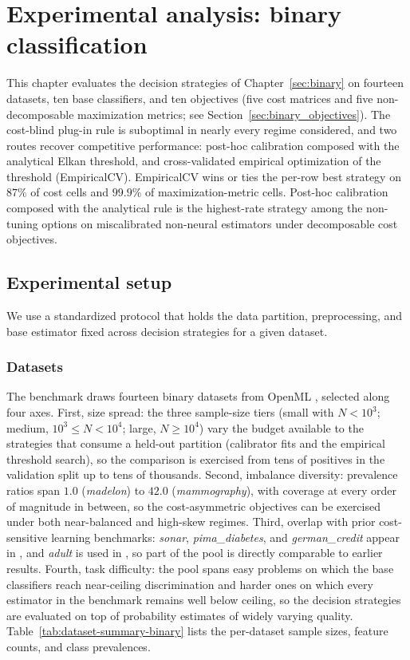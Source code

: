 \chapter{Experimental analysis: binary classification}\label{sec:binary_experiments}

This chapter evaluates the decision strategies of Chapter~\ref{sec:binary} on fourteen datasets, ten base classifiers, and ten objectives (five cost matrices and five non-decomposable maximization metrics; see Section~\ref{sec:binary_objectives}). The cost-blind plug-in rule is suboptimal in nearly every regime considered, and two routes recover competitive performance: post-hoc calibration composed with the analytical Elkan threshold, and cross-validated empirical optimization of the threshold (EmpiricalCV). EmpiricalCV wins or ties the per-row best strategy on $87\%$ of cost cells and $99.9\%$ of maximization-metric cells. Post-hoc calibration composed with the analytical rule is the highest-rate strategy among the non-tuning options on miscalibrated non-neural estimators under decomposable cost objectives.

\section{Experimental setup}

We use a standardized protocol that holds the data partition, preprocessing, and base estimator fixed across decision strategies for a given dataset.

\subsection{Datasets}
The benchmark draws fourteen binary datasets from OpenML \citep{vanschoren2014openml}, selected along four axes. First, size spread: the three sample-size tiers (small with $N < 10^3$; medium, $10^3 \leq N < 10^4$; large, $N \geq 10^4$) vary the budget available to the strategies that consume a held-out partition (calibrator fits and the empirical threshold search), so the comparison is exercised from tens of positives in the validation split up to tens of thousands. Second, imbalance diversity: prevalence ratios span $1.0$ (\textit{madelon}) to $42.0$ (\textit{mammography}), with coverage at every order of magnitude in between, so the cost-asymmetric objectives can be exercised under both near-balanced and high-skew regimes. Third, overlap with prior cost-sensitive learning benchmarks: \textit{sonar}, \textit{pima\_diabetes}, and \textit{german\_credit} appear in \citet{sheng2006thresholding}, and \textit{adult} is used in \citet{elkan2001foundations}, so part of the pool is directly comparable to earlier results. Fourth, task difficulty: the pool spans easy problems on which the base classifiers reach near-ceiling discrimination and harder ones on which every estimator in the benchmark remains well below ceiling, so the decision strategies are evaluated on top of probability estimates of widely varying quality. Table~\ref{tab:dataset-summary-binary} lists the per-dataset sample sizes, feature counts, and class prevalences.

